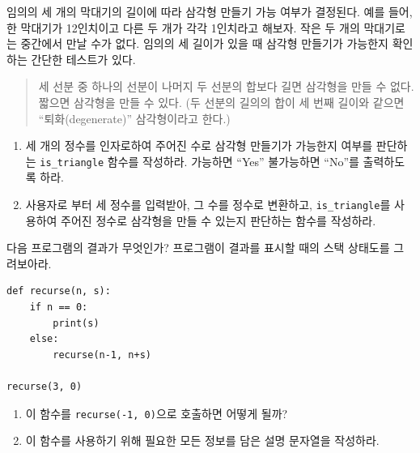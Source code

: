\documentclass[10pt]{book}
\begin{document}
\begin{exercise}

임의의 세 개의 막대기의 길이에 따라 삼각형 만들기 가능 여부가
결정된다.  예를 들어, 한 막대기가 12인치이고 다른 두 개가 각각
1인치라고 해보자.  작은 두 개의 막대기로는 중간에서 만날 수가 없다.
임의의 세 길이가 있을 때 삼각형 만들기가 가능한지 확인하는 간단한
테스트가 있다.

\begin{quotation}
  세 선분 중 하나의 선분이 나머지 두 선분의 합보다 길면 삼각형을 만들
  수 없다.  짧으면 삼각형을 만들 수 있다.  (두 선분의 길의의 합이 세
  번째 길이와 같으면 ``퇴화(degenerate)'' 삼각형이라고 한다.)
\end{quotation}

\begin{enumerate}

\item 세 개의 정수를 인자로하여 주어진 수로 삼각형 만들기가 가능한지
  여부를 판단하는 \verb"is_triangle" 함수를 작성하라.  가능하면
  ``Yes'' 불가능하면 ``No''를 출력하도록 하라.

\item 사용자로 부터 세 정수를 입력받아, 그 수를 정수로 변환하고,
  \verb"is_triangle"를 사용하여 주어진 정수로 삼각형을 만들 수 있는지
  판단하는 함수를 작성하라.

\end{enumerate}

\end{exercise}

\begin{exercise}
다음 프로그램의 결과가 무엇인가?
프로그램이 결과를 표시할 때의 스택 상태도를 그려보아라. 

\begin{verbatim}
def recurse(n, s):
    if n == 0:
        print(s)
    else:
        recurse(n-1, n+s)

recurse(3, 0)
\end{verbatim}

\begin{enumerate}

\item 이 함수를 {\tt recurse(-1, 0)}으로 호출하면 어떻게 될까?

\item 이 함수를 사용하기 위해 필요한 모든 정보를 담은 설명 문자열을 작성하라.

\end{enumerate}

\end{exercise}
\end{document}
